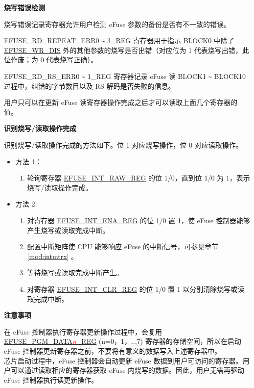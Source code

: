 \documentclass[main\_\_CN.tex]{subfiles}
\begin{document}
{\bfseries 烧写错误检测}

烧写错误记录寄存器允许用户检测 eFuse 参数的备份是否有不一致的错误。

EFUSE\_RD\_REPEAT\_ERR0 \verb+~+ 3\_REG 寄存器用于指示 BLOCK0 中除了 \hyperref[fielddesc:EFUSEWRDIS]{EFUSE\_WR\_DIS} 外的其他参数的烧写是否出错（对应位为 1 代表烧写出错，此位作废；为 0 代表烧写正确）。

EFUSE\_RD\_RS\_ERR0 \verb+~+ 1\_REG 寄存器记录 eFuse 读 BLOCK1 \verb+~+ BLOCK10 过程中，纠错的字节数目以及 RS 解码是否失败的信息。

用户只可以在更新 eFuse 读寄存器操作完成之后才可以读取上面几个寄存器的值。

{\bfseries 识别烧写/读取操作完成}
\label{other:tip-program-and-read-done-interrupt}

识别烧写/读取操作完成的方法如下。位 1 对应烧写操作，位 0 对应读取操作。
\begin{itemize}

    \item 方法 1：
        \begin{enumerate}
            \item 轮询寄存器 \hyperref[regdesc:EFUSEINTRAWREG]{EFUSE\_INT\_RAW\_REG} 的位 1/0，直到位 1/0 为 1，表示烧写/读取操作完成。
        \end{enumerate}
    \item 方法 2:
        \begin{enumerate}
            \item 对寄存器 \hyperref[regdesc:EFUSEINTENAREG]{EFUSE\_INT\_ENA\_REG} 的位 1/0 置 1，使 eFuse 控制器能够产生烧写或读取完成中断。
            \item 配置中断矩阵使 CPU 能够响应 eFuse 的中断信号，可参见章节 \ref{mod:intmtrx} \textit{}。

            \item 等待烧写或读取完成中断产生。

            \item 对寄存器 \hyperref[regdesc:EFUSEINTCLRREG]{EFUSE\_INT\_CLR\_REG} 的位 1/0 置 1 以分别清除烧写或读取完成中断。
    \end{enumerate}
\end{itemize}

{\bfseries 注意事项}

在 eFuse 控制器执行寄存器更新操作过程中，会复用 \hyperref[regdesc:EFUSEPGMDATA0REG]{EFUSE\_PGM\_DATA\textcolor{red}{\it{n}}\_REG} (n=0，1，..,7) 寄存器的存储空间，所以在启动 eFuse 控制器更新寄存器之前，不要将有意义的数据写入上述寄存器中。\\
芯片启动过程中，eFuse 控制器会自动更新 eFuse 数据到用户可访问的寄存器。用户可以通过读取相应的寄存器获取 eFuse 内烧写的数据。因此，用户无需再驱动 eFuse 控制器执行读更新操作。
\end{document}
